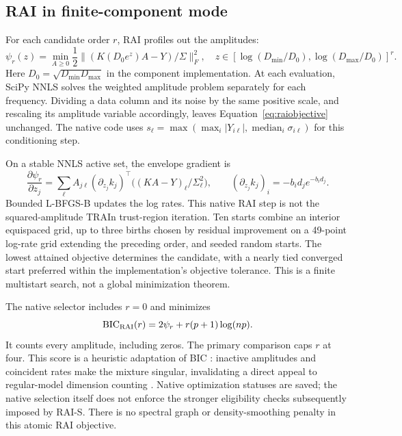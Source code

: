 \subsection{RAI in finite-component mode}\label{sec:raiatomic}
For each candidate order $r$, RAI profiles out the amplitudes:
\begin{equation}\label{eq:raiobjective}
 \psi_r(z)=\min_{A\geq0}\frac12\|(K(D_0e^z)A-Y)/\Sigma\|_F^2,
 \quad z\in[\log(D_{\min}/D_0),\log(D_{\max}/D_0)]^r.
\end{equation}
Here $D_0=\sqrt{D_{\min}D_{\max}}$ in the component implementation. At each evaluation, SciPy NNLS solves the weighted amplitude problem separately for each frequency. Dividing a data column and its noise by the same positive scale, and rescaling its amplitude variable accordingly, leaves Equation~\eqref{eq:raiobjective} unchanged. The native code uses $s_\ell=\max(\max_i|Y_{i\ell}|,\operatorname{median}_i\sigma_{i\ell})$ for this conditioning step.

On a stable NNLS active set, the envelope gradient is
\begin{equation}\label{eq:raigradient}
 \frac{\partial\psi_r}{\partial z_j}
 =\sum_\ell A_{j\ell}(\partial_{z_j}k_j)^\top
       \bigl((K A-Y)_\ell/\Sigma_\ell^2\bigr),
 \qquad (\partial_{z_j}k_j)_i=-b_i d_j e^{-b_id_j}.
\end{equation}
Bounded L-BFGS-B updates the log rates. This native RAI step is not the squared-amplitude TRAIn trust-region iteration. Ten starts combine an interior equispaced grid, up to three births chosen by residual improvement on a 49-point log-rate grid extending the preceding order, and seeded random starts. The lowest attained objective determines the candidate, with a nearly tied converged start preferred within the implementation's objective tolerance. This is a finite multistart search, not a global minimization theorem.

The native selector includes $r=0$ and minimizes
\begin{equation}\label{eq:raibic}
 \mathrm{BIC}_{\rm RAI}(r)=2\psi_r+r(p+1)\log(np).
\end{equation}
It counts every amplitude, including zeros. The primary comparison caps $r$ at four. This score is a heuristic adaptation of BIC \cite{schwarz}: inactive amplitudes and coincident rates make the mixture singular, invalidating a direct appeal to regular-model dimension counting \cite{watanabe}. Native optimization statuses are saved; the native selection itself does not enforce the stronger eligibility checks subsequently imposed by RAI-S. There is no spectral graph or density-smoothing penalty in this atomic RAI objective.

